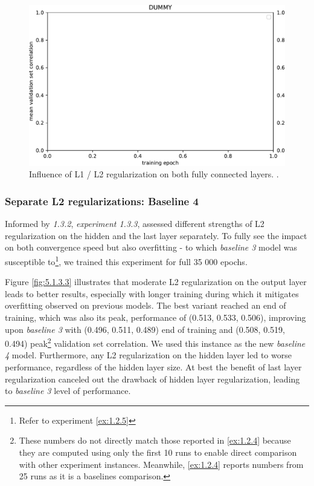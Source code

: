 \begin{figure}[H]
    \centering
    \includegraphics[width=1\textwidth]{../figures/05_dummy}
    \caption[Experiment 5.1.3.2]{Influence of L1 / L2 regularization on both fully connected layers.
.}
    \label{fig:5.1.3.2}
\end{figure}

\subsubsection{Separate L2 regularizations: Baseline 4}\label{ex:1.3.3}

Informed by \textit{1.3.2}, \textit{experiment 1.3.3}, assessed different strengths of L2 regularization on the hidden and the last layer separately. To fully see the impact on both convergence speed but also overfitting - to which \textit{baseline 3} model was susceptible to\footnote{Refer to experiment \ref{ex:1.2.5}}, we trained this experiment for full 35 000 epochs.

Figure \ref{fig:5.1.3.3} illustrates that moderate L2 regularization on the output layer leads to better results, especially with longer training during which it mitigates overfitting observed on previous models. The best variant reached an end of training, which was also its peak, performance of (0.513, 0.533, 0.506), improving upon \textit{baseline 3} with (0.496, 0.511, 0.489) end of training and (0.508, 0.519, 0.494) peak\footnote{These numbers do not directly match those reported in \ref{ex:1.2.4} because they are computed using only the first 10 runs to enable direct comparison with other experiment instances. Meanwhile, \ref{ex:1.2.4} reports numbers from 25 runs as it is a baselines comparison.} validation set correlation. We used this instance as the new \textit{baseline 4} model. Furthermore, any L2 regularization on the hidden layer led to worse performance, regardless of the hidden layer size. At best the benefit of last layer regularization canceled out the drawback of hidden layer regularization, leading to \textit{baseline 3} level of performance.

